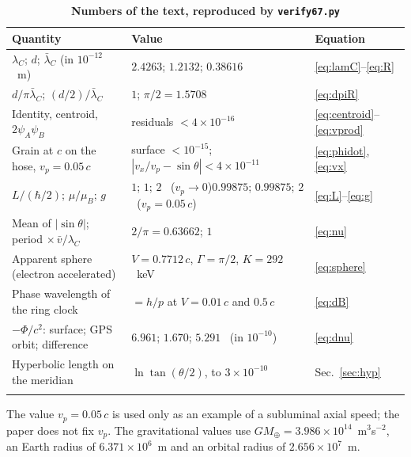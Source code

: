 \documentclass[%
 reprint, amsmath,amssymb, aps, prb, ]{revtex4-2}
\numberwithin{equation}{section}
\newcommand{\lamC}{\lambda_C}
\newcommand{\lbar}{\bar{\lambda}_C}
\begin{document}
\begin{table}[t!]
\centering
\caption{\textbf{Numbers of the text, reproduced by \texttt{verify67.py}}}
\label{tab:numbers}
\renewcommand{\arraystretch}{1.4}
\begin{tabular}{p{5.4cm}p{5.6cm}p{4.0cm}}
\toprule
\textbf{Quantity} & \textbf{Value} & \textbf{Equation} \\
\midrule
$\lamC$; $d$; $\lbar$ (in $10^{-12}$~m)
& $2.4263$; $1.2132$; $0.38616$
& \eqref{eq:lamC}--\eqref{eq:R} \\
\addlinespace[0.3cm]
$d/\pi\lbar$; $(d/2)/\lbar$
& $1$; $\pi/2 = 1.5708$
& \eqref{eq:dpiR} \\
\addlinespace[0.3cm]
Identity, centroid, $2\psi_A\psi_B$
& residuals $< 4\times10^{-16}$
& \eqref{eq:centroid}--\eqref{eq:vprod} \\
\addlinespace[0.3cm]
Grain at $c$ on the hose, $v_p = 0.05\,c$
& surface $< 10^{-15}$;\newline $|v_x/v_p - \sin\theta| < 4\times10^{-11}$
& \eqref{eq:phidot}, \eqref{eq:vx} \\
\addlinespace[0.3cm]
$L/(\hbar/2)$; $\mu/\mu_B$; $g$
& $1$; $1$; $2$ \ ($v_p \to 0$)\newline $0.99875$; $0.99875$; $2$ \ ($v_p = 0.05\,c$)
& \eqref{eq:L}--\eqref{eq:g} \\
\addlinespace[0.3cm]
Mean of $|\sin\theta|$; period $\times\,\bar v/\lamC$
& $2/\pi = 0.63662$; $1$
& \eqref{eq:nu} \\
\addlinespace[0.3cm]
Apparent sphere (electron accelerated)
& $V = 0.7712\,c$, $\Gamma = \pi/2$, $K = 292$~keV
& \eqref{eq:sphere} \\
\addlinespace[0.3cm]
Phase wavelength of the ring clock
& $= h/p$ at $V = 0.01\,c$ and $0.5\,c$
& \eqref{eq:dB} \\
\addlinespace[0.3cm]
$-\Phi/c^2$: surface; GPS orbit; difference
& $6.961$; $1.670$; $5.291$ \ (in $10^{-10}$)
& \eqref{eq:dnu} \\
\addlinespace[0.3cm]
Hyperbolic length on the meridian
& $\ln\tan(\theta/2)$, to $3\times10^{-10}$
& Sec.~\ref{sec:hyp} \\
\addlinespace[0.2cm]
\bottomrule
\end{tabular}
\vspace{0.2cm}
\begin{minipage}{0.95\textwidth}
\justifying\footnotesize
The value $v_p = 0.05\,c$ is used only as an example of a subluminal axial speed; the paper does not fix $v_p$. The gravitational values use $GM_\oplus = 3.986\times10^{14}$~m$^3$s$^{-2}$, an Earth radius of $6.371\times10^{6}$~m and an orbital radius of $2.656\times10^{7}$~m.
\end{minipage}
\end{table}
\end{document}
